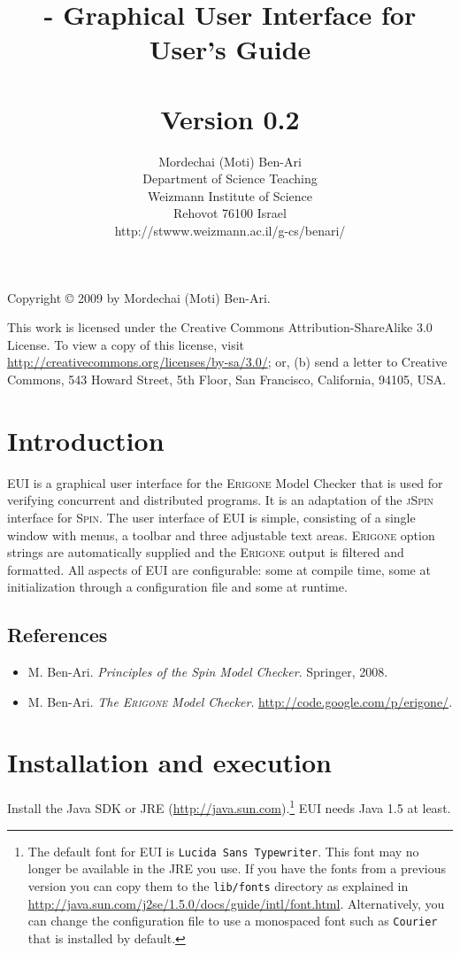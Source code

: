 \documentclass[11pt]{article}
\title{\eui{} - Graphical User Interface for \eri{}\\User's Guide\\\mbox{}\\\large{Version 0.2}}
\author{Mordechai (Moti) Ben-Ari\\
Department of Science Teaching\\
Weizmann Institute of Science\\
Rehovot 76100 Israel\\
\textsf{http://stwww.weizmann.ac.il/g-cs/benari/}}
\newcommand{\spn}{\textsc{Spin}}
\newcommand{\eri}{\textsc{Erigone}}
\newcommand{\eui}{\textsc{EUI}}
\newcommand{\js}{\textsc{jSpin}}
\newcommand{\p}[1]{\texttt{#1}}
\begin{document}
\maketitle
\thispagestyle{empty}

\vfill

\begin{center}
Copyright \copyright{} 2009 by Mordechai (Moti) Ben-Ari.
\end{center}

This work is licensed under the Creative Commons Attribution-ShareAlike 3.0
License. To view a copy of this license, visit
\url{http://creativecommons.org/licenses/by-sa/3.0/}; or, (b) send a letter
to Creative Commons, 543 Howard Street, 5th Floor, San Francisco,
California, 94105, USA.

\newpage

\section{Introduction}

\eui{} is a graphical user interface for the \eri{} Model Checker that is
used for verifying concurrent and distributed programs. It is an adaptation
of the \js{} interface for \spn{}.
The user interface of \eui{} is simple, consisting of a single window
with menus, a toolbar and three adjustable text areas. \eri{} option
strings are automatically supplied and the \eri{} output is filtered and
formatted. All aspects of \eui{} are configurable: some at compile time,
some at initialization through a configuration file and some at runtime.

\subsection*{References}
\begin{itemize}
\item M. Ben-Ari. \textit{Principles of the Spin Model Checker}. Springer, 2008.
\item M. Ben-Ari. \textit{The \eri{} Model Checker}. \url{http://code.google.com/p/erigone/}.
\end{itemize}

\section{Installation and execution}
Install the Java SDK or JRE (\url{http://java.sun.com}).\footnote{The
default font for \eui{} is \p{Lucida Sans Typewriter}. This font may no longer be
available in the JRE you use. If you have the fonts from a previous version you
can copy them to the \p{lib/fonts} directory as explained in
\url{http://java.sun.com/j2se/1.5.0/docs/guide/intl/font.html}. Alternatively,
you can change the configuration file to use a monospaced font such as
\p{Courier} that is installed by default.} \eui{} needs Java 1.5 at least.
\end{document}
